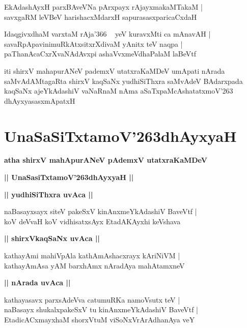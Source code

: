 \documentclass[twoside,12pt,openright]{book}
\def\S{\char'263}
\newcounter{shloka}[chapter]
\def\uvaca#1{\centerline{{\large\textbf{#1}}}}
\begin{document}
\begin{shloka}%
EkAdashAyxH parxBAveVNa pArxpayx rAjayxmakaMTakaM |\\
savxgaRM leVBeV harishacxMdarxH sapurasasxparicaCxdaH
\end{shloka}

\begin{shloka}%
IdaqgivxdhaM varxtaM rAja\char'366 ~ yeV kuravxMti ca mAnavAH |\\
savaRpApavinimuRkAtxsitxrXdivaM yAnitx teV naqpa |\\
paThanAcaCxrXvaNAdAvxpi ashaVvxmeVdhaPalaM laBeVtf
\end{shloka}

\begin{center}
iti shirxV mahapurANeV pademxV utatxraKaMDeV umApati nArada saMvAdAMtagaRta shirxV kaqSaNx 
yudhiSiThxra saMvAdeV BAdarxpada kaqSaNx ajeYkAdashiV vaNaRnaM nAma aSaTxpaMcAshatatxmoV\S 
dhAyxyasasxmApatxH
\end{center}

\chapter{UnaSaSiTxtamoV\S dhAyxyaH}

\begin{center}
{\LARGE\bfseries atha shirxV mahApurANeV pAdemxV utatxraKaMDeV}
\end{center}

\begin{center}
{\LARGE\bfseries || UnaSasiTxtamoV\S dhAyxyaH ||}
\end{center}

\uvaca{|| yudhiSiThxra uvAca ||}

\begin{shloka}%
naBasayxsayx siteV pakeSxV kinAnxmeYkAdashiV BaveVtf |\\
koV deVvaH koV vidhisatxsAyx EtadAKAyxhi keVshava
\end{shloka}

\uvaca{|| shirxVkaqSaNx uvAca ||}

\begin{shloka}%
kathayAmi mahiVpAla kathAmAshacxrayx kAriNiVM |\\
kathayAmAsa yAM barxhAmx nAradAya mahAtamxneV
\end{shloka}

\uvaca{|| nArada uvAca ||}

\begin{shloka}%
kathayasavx parxsAdeVva catumuRKa namoVsutx teV |\\
naBasayx shukalxpakeSxV tu kinAnxmeYkAdashiV BaveVtf |\\
EtadicACxmayxhaM shorxVtuM viSoNxVrArAdhanAya veY
\end{shloka}
\end{document}
